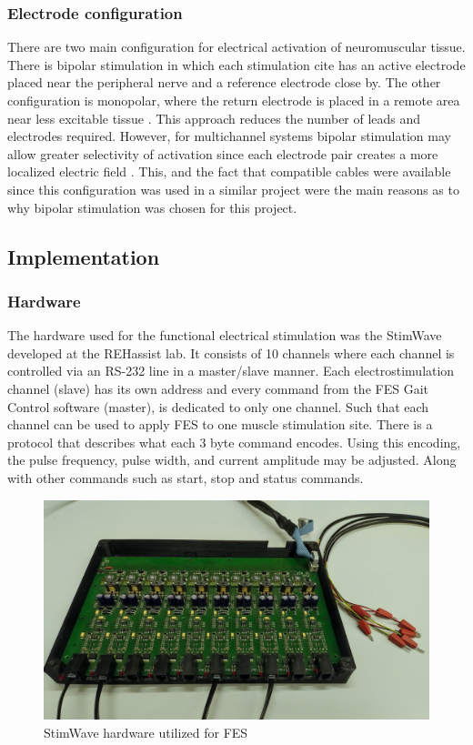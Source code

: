 \subsubsection{Electrode configuration}
There are two main configuration for electrical activation of neuromuscular tissue. There is bipolar stimulation in which each stimulation cite has an active electrode placed near the peripheral nerve and a reference electrode close by. The other configuration is monopolar, where the return electrode is placed in a remote area near less excitable tissue \cite{peckham_functional_2005}. 
This approach reduces the number of leads and electrodes required. However, for multichannel systems bipolar stimulation may allow greater selectivity of activation since each electrode pair creates a more localized electric field \cite{grandjean_recruitment_1986}. This, and the fact that compatible cables were available since this configuration was used in a similar project were the main reasons as to why bipolar stimulation was chosen for this project.

\subsection{Implementation}
\subsubsection{Hardware}
The hardware used for the functional electrical stimulation was the StimWave developed at the REHassist lab. It consists of 10 channels where each channel is controlled via an RS-232 line in a master/slave manner. Each electrostimulation channel (slave) has its own address and every command from the FES Gait Control software (master), is dedicated to only one channel. Such that each channel can be used to apply FES to one muscle stimulation site. There is a protocol that describes what each 3 byte command encodes. Using this encoding, the pulse frequency, pulse width, and current amplitude may be adjusted. Along with other commands such as start, stop and status commands. 

\begin{figure} [h]
    \centering
    \includegraphics[width=0.8\linewidth]{images/stimwave.jpg}
    \caption{StimWave hardware utilized for FES}
    \label{fig:stimwave}
\end{figure}

